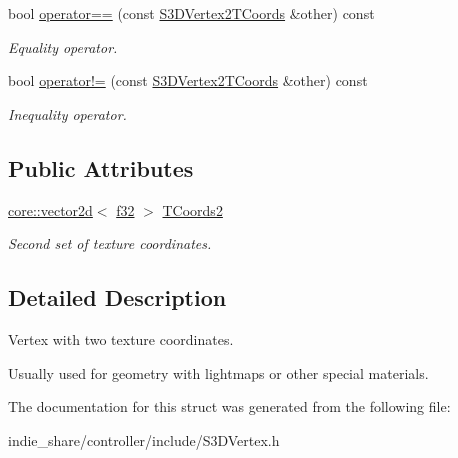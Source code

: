 \begin{DoxyCompactItemize}
\mbox{\label{structirr_1_1video_1_1S3DVertex2TCoords_a98609ec21b65ce72bebbd0be09e8553b}} 
bool \hyperlink{structirr_1_1video_1_1S3DVertex2TCoords_a98609ec21b65ce72bebbd0be09e8553b}{operator==} (const \hyperlink{structirr_1_1video_1_1S3DVertex2TCoords}{S3\+D\+Vertex2\+T\+Coords} \&other) const
\begin{DoxyCompactList}\small\item\em Equality operator. \end{DoxyCompactList}\item 
\mbox{\label{structirr_1_1video_1_1S3DVertex2TCoords_a0ea9fd4f215bc4677cd192fc0dc31376}} 
bool \hyperlink{structirr_1_1video_1_1S3DVertex2TCoords_a0ea9fd4f215bc4677cd192fc0dc31376}{operator!=} (const \hyperlink{structirr_1_1video_1_1S3DVertex2TCoords}{S3\+D\+Vertex2\+T\+Coords} \&other) const
\begin{DoxyCompactList}\small\item\em Inequality operator. \end{DoxyCompactList}\end{DoxyCompactItemize}
\subsection*{Public Attributes}
\begin{DoxyCompactItemize}
\item 
\mbox{\label{structirr_1_1video_1_1S3DVertex2TCoords_a5c6a79bab5e6df90a73631787be6e737}} 
\hyperlink{classirr_1_1core_1_1vector2d}{core\+::vector2d}$<$ \hyperlink{namespaceirr_a0277be98d67dc26ff93b1a6a1d086b07}{f32} $>$ \hyperlink{structirr_1_1video_1_1S3DVertex2TCoords_a5c6a79bab5e6df90a73631787be6e737}{T\+Coords2}
\begin{DoxyCompactList}\small\item\em Second set of texture coordinates. \end{DoxyCompactList}\end{DoxyCompactItemize}


\subsection{Detailed Description}
Vertex with two texture coordinates. 

Usually used for geometry with lightmaps or other special materials. 

The documentation for this struct was generated from the following file\+:\begin{DoxyCompactItemize}
\item 
indie\+\_\+share/controller/include/S3\+D\+Vertex.\+h\end{DoxyCompactItemize}
